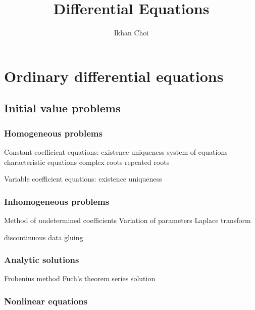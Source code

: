 \documentclass{../../large}
\begin{document}
\title{Differential Equations}
\author{Ikhan Choi}
\maketitle
\tableofcontents


\part{Ordinary differential equations}


\chapter{Initial value problems}
\section{Homogeneous problems}

Constant coefficient equations:
existence uniqueness system of equations
characteristic equations
complex roots
repeated roots


Variable coefficient equations:
existence uniqueness


\section{Inhomogeneous problems}
Method of undetermined coefficients
Variation of parameters
Laplace transform

discontinuous data gluing


\section{Analytic solutions}
Frobenius method
Fuch's theorem
series solution


\section{Nonlinear equations}
\end{document}
